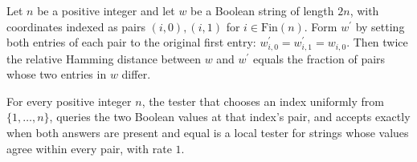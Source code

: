 \begin{theorem}
\label{FABL.two_mul_relativeHammingDist_equalityPairRepair}
\leanok
{}
Let $n$ be a positive integer and let $w$ be a Boolean string of length $2n$, with
coordinates indexed as pairs $(i,0),(i,1)$ for $i\in\mathrm{Fin}(n)$. Form $w^\prime$ by
setting both entries of each pair to the original first entry: $w^\prime_{i,0}=w^\prime_{i,1}=w_{i,0}$.
Then twice the relative Hamming distance between $w$ and $w^\prime$ equals the fraction
of pairs whose two entries in $w$ differ.
\end{theorem}

\begin{theorem}
\label{FABL.equalityPairStringTester_isLocalTester}
\leanok
{}
For every positive integer $n$, the tester that chooses an index uniformly from
$\{1,\ldots,n\}$, queries the two Boolean values at that index's pair, and accepts
exactly when both answers are present and equal is a local tester for strings whose
values agree within every pair, with rate $1$.
\end{theorem}
